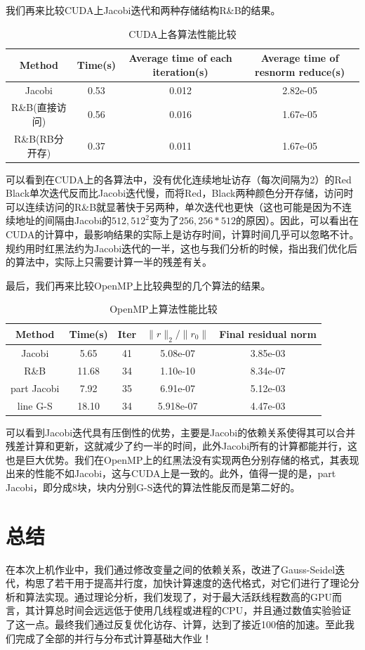 \documentclass{article}
\begin{document}
我们再来比较CUDA上Jacobi迭代和两种存储结构R\&B的结果。
\begin{table}[H]
	\centering
	\begin{tabular}{|c|c|c|c|}
		\hline	Method & Time(s) & Average time of each iteration(s) &Average time of resnorm reduce(s)\\ 
		\hline	Jacobi  &0.53 & 0.012 & 2.82e-05\\
		\hline	R\&B(直接访问) &0.56 &  0.016 &1.67e-05\\
		\hline	R\&B(RB分开存) &0.37 &  0.011 &1.67e-05\\\hline
	\end{tabular}
	\caption{CUDA上各算法性能比较}
\end{table}
可以看到在CUDA上的各算法中，没有优化连续地址访存（每次间隔为2）的Red Black单次迭代反而比Jacobi迭代慢，而将Red，Black两种颜色分开存储，访问时可以连续访问的R\&B就显著快于另两种，单次迭代也更快（这也可能是因为不连续地址的间隔由Jacobi的$512,512^2$变为了$256,256*512$的原因）。因此，可以看出在CUDA的计算中，最影响结果的实际上是访存时间，计算时间几乎可以忽略不计。规约用时红黑法约为Jacobi迭代的一半，这也与我们分析的时候，指出我们优化后的算法中，实际上只需要计算一半的残差有关。

最后，我们再来比较OpenMP上比较典型的几个算法的结果。
\begin{table}[H]
	\centering
	\begin{tabular}{|c|c|c|c|c|}
		\hline	Method & Time(s) & Iter & $\|r\|_2/\|r_0\|$  &  Final residual norm \\ 
		\hline	Jacobi  & 5.65 &  41 & 5.08e-07 &  3.85e-03 \\
		\hline	 R\&B & 11.68&  34 & 1.10e-10 & 8.34e-07  \\
		\hline	 part Jacobi &7.92 & 35 & 6.91e-07  &5.12e-03 \\
		\hline	 line G-S &18.10 & 34 & 5.918e-07  &4.47e-03  \\\hline
	\end{tabular}
	\caption{OpenMP上算法性能比较}
\end{table}
可以看到Jacobi迭代具有压倒性的优势，主要是Jacobi的依赖关系使得其可以合并残差计算和更新，这就减少了约一半的时间，此外Jacobi所有的计算都能并行，这也是巨大优势。我们在OpenMP上的红黑法没有实现两色分别存储的格式，其表现出来的性能不如Jacobi，这与CUDA上是一致的。此外，值得一提的是，part Jacobi，即分成8块，块内分别G-S迭代的算法性能反而是第二好的。
\section{总结}
在本次上机作业中，我们通过修改变量之间的依赖关系，改进了Gauss-Seidel迭代，构思了若干用于提高并行度，加快计算速度的迭代格式，对它们进行了理论分析和算法实现。通过理论分析，我们发现了，对于最大活跃线程数高的GPU而言，其计算总时间会远远低于使用几线程或进程的CPU，并且通过数值实验验证了这一点。最终我们通过反复优化访存、计算，达到了接近100倍的加速。至此我们完成了全部的并行与分布式计算基础大作业！
	  
	\nocite{*}

\end{document}
